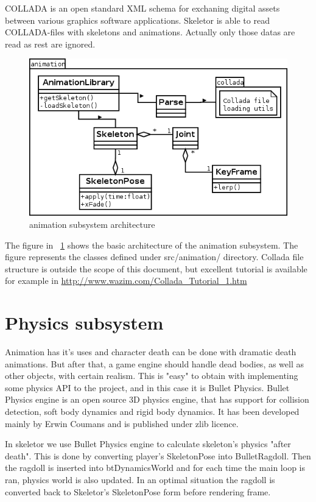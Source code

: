 \documentclass[11pt,twoside,a4paper]{article}
\begin{document}
COLLADA is an open standard XML schema for exchaning digital assets between various graphics software applications. Skeletor is able to read COLLADA-files with skeletons and animations. Actually only those datas are read as rest are ignored. 

\begin{figure}
  \centering
    \includegraphics[scale=0.7]{animation_subsystem.png}
  \caption{animation subsystem architecture}
  \label{animsubsys}
\end{figure}

The figure in ~\ref{animsubsys} shows the basic architecture of the animation subsystem. The figure represents the classes defined under src/animation/ directory. Collada file structure is outside the scope of this document, but excellent tutorial is available for example in \url{http://www.wazim.com/Collada_Tutorial_1.htm}

\section{Physics subsystem}

Animation has it's uses and character death can be done with dramatic death animations. But after that, a game engine should handle dead bodies, as well as other objects, with certain realism. This is "easy" to obtain with implementing some physics API to the project, and in this case it is Bullet Physics. Bullet Physics engine is an open source 3D physics engine, that has support for collision detection, soft body dynamics and rigid body dynamics. It has been developed mainly by Erwin Coumans and is published under zlib licence.

In skeletor we use Bullet Physics engine to calculate skeleton's physics "after death". This is done by converting player's SkeletonPose into BulletRagdoll. Then the ragdoll is inserted into btDynamicsWorld and for each time the main loop is ran, physics world is also updated. In an optimal situation the ragdoll is converted back to Skeletor's SkeletonPose form before rendering frame.
\end{document}
